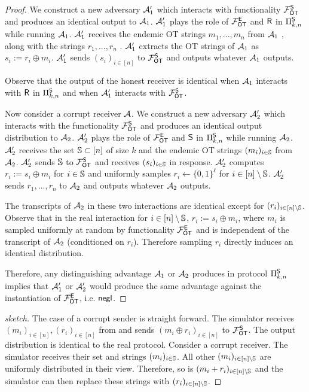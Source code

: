 \iffullversion
\begin{proof}
 We construct a new adversary $\mathcal{A}_1'$ which interacts with functionality $\mathcal{F}_{\mathsf{OT}}^\mathsf{S}$ and produces an identical output  to $\mathcal{A}_1$.  $\mathcal{A}_1'$ plays the role of $\mathcal{F}_{\mathsf{OT}}^\mathsf{E}$ and $\mathsf{R}$ in $\Pi^{\mathsf{S}}_{k,n}$ while running $\mathcal{A}_1$. $\mathcal{A}_1'$ receives the endemic OT strings $m_1,...,m_n$ from $\mathcal{A}_1$%
, along with the strings $r_1,...,r_n$%
.  $\mathcal{A}_1'$ extracts the OT strings of $\mathcal{A}_1$ as $s_i:=r_i\oplus m_i$. $\mathcal{A}_1'$ sends $(s_i)_{i\in [n]}$ to $\mathcal{F}_{\mathsf{OT}}^\mathsf{S}$ and outputs whatever $\mathcal{A}_1$ outputs.
	
	Observe that the output of the honest receiver is identical when $\mathcal{A}_1$ interacts with $\mathsf{R}$ in $\Pi^{\mathsf{S}}_{k,n}$ and when $\mathcal{A}_1'$ interacts with $\mathcal{F}_{\mathsf{OT}}^\mathsf{S}$.
	
	
	
	Now consider a corrupt receiver $\mathcal{A}$. We construct a new adversary $\mathcal{A}_2'$ which interacts with the functionality $\mathcal{F}_{\mathsf{OT}}^\mathsf{S}$ and produces an identical output distribution to $\mathcal{A}_2$. $\mathcal{A}_2'$ plays the role of $\mathcal{F}_{\mathsf{OT}}^\mathsf{E}$ and $\mathsf{S}$ in $\Pi^{\mathsf{S}}_{k,n}$ while running $\mathcal{A}_2$. $\mathcal{A}_2'$ receives the set $\mathsf{\mathbb S}\subset[n]$ of size $k$ and the endemic OT strings $(m_i)_{i\in \mathsf{\mathbb S}}$ from $\mathcal{A}_2$. $\mathcal{A}_2'$ sends $\mathsf{\mathbb S}$ to  $\mathcal{F}_{\mathsf{OT}}^\mathsf{S}$ and receives $(s_i)_{i\in \mathsf{\mathbb S}}$ in response. $\mathcal{A}_2'$ computes $r_i:=s_i\oplus m_i$ for $i\in \mathsf{\mathbb S}$ and uniformly samples $r_i\gets \{0,1\}^\ell$ for $i\in [n]\setminus \mathsf{\mathbb S}$. $\mathcal{A}_2'$ sends $r_1,...,r_n$ to $\mathcal{A}_2$ and outputs whatever $\mathcal{A}_2$ outputs.

	The transcripts of $\mathcal{A}_2$ in these two interactions are identical except for $(r_i)_{i\in [n]\setminus \mathsf{\mathbb S}}$. Observe that in the real interaction for $i\in [n]\setminus\mathsf{\mathbb S}$, $r_i:=s_i\oplus m_i$, where $m_i$ is sampled uniformly at random  by functionality $\mathcal{F}_{\mathsf{OT}}^\mathsf{E}$ and is independent of the transcript of $\mathcal{A}_2$ (conditioned on $r_i$). Therefore sampling $r_i$ directly induces an identical distribution. 
	
	Therefore, any distinguishing advantage $\mathcal{A}_1$ or $\mathcal{A}_2$ produces in protocol $\Pi^{\mathsf{S}}_{k,n}$ implies that $\mathcal{A}_1'$ or $\mathcal{A}_2'$ would produce the same advantage against the instantiation of $\mathcal{F}_{\mathsf{OT}}^\mathsf{E}$, i.e. $\mathsf{negl}$.
\end{proof}
\else
\begin{proof}[sketch]	
	The case of a corrupt sender is straight forward. The simulator receives $(m_i)_{i\in[n]},(r_i)_{i\in[n]}$ from \rec and sends $(m_i\oplus r_i)_{i\in[n]}$ to $\mathcal{F}_{\mathsf{OT}}^\mathsf{S}$. The output distribution is identical to the real protocol. Consider a corrupt receiver. The simulator receives their set \set and strings $(m_i)_{i\in{\ensuremath{\mathsf{\mathbb S}}}}$. All other $(m_i)_{i\in{[n]\setminus\ensuremath{\mathsf{\mathbb S}}}}$ are uniformly distributed in their view. Therefore, so is $(m_i+r_i)_{i\in{[n]\setminus\ensuremath{\mathsf{\mathbb S}}}}$ and the simulator can then replace these strings with $(r_i)_{i\in{[n]\setminus\ensuremath{\mathsf{\mathbb S}}}}$.
\pe
\end{proof}
\fi

